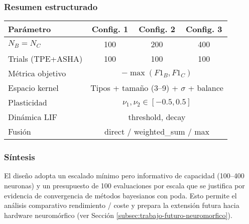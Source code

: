 \subsubsection{Resumen estructurado}
\begin{center}
\begin{tabular}{lccc}
\hline
Parámetro & Config. 1 & Config. 2 & Config. 3 \\
\hline
$N_B = N_C$ & 100 & 200 & 400 \\
Trials (TPE+ASHA) & 100 & 100 & 100 \\
Métrica objetivo & \multicolumn{3}{c}{$-\max(F1_B,F1_C)$} \\
Espacio kernel & \multicolumn{3}{c}{Tipos + tamaño (3--9) + $\sigma$ + balance} \\
Plasticidad & \multicolumn{3}{c}{$\nu_1,\nu_2 \in [-0.5,0.5]$} \\
Dinámica LIF & \multicolumn{3}{c}{threshold, decay} \\
Fusión & \multicolumn{3}{c}{direct / weighted\_sum / max} \\
\hline
\end{tabular}
\end{center}

\subsubsection{Síntesis}
El diseño adopta un escalado mínimo pero informativo de capacidad (100–400 neuronas) y un presupuesto de 100 evaluaciones por escala que se justifica por evidencia de convergencia de métodos bayesianos con poda. Esto permite el análisis comparativo rendimiento / coste y prepara la extensión futura hacia hardware neuromórfico (ver Sección \ref{subsec:trabajo-futuro-neuromorfico}).



